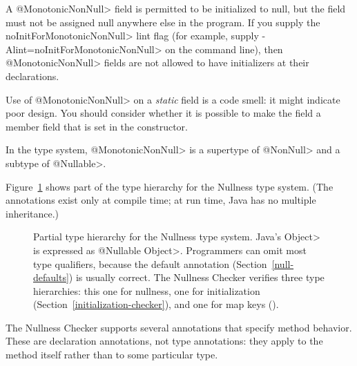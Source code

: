 \begin{description}
  A \<@MonotonicNonNull> field is permitted to be initialized to null, but the
  field must not be assigned null anywhere else in the program.  If you
  supply the \<noInitForMonotonicNonNull> lint flag (for example, supply
  \<-Alint=noInitForMonotonicNonNull> on the command line), then
  \<@MonotonicNonNull> fields are not allowed to have initializers at their
  declarations.

  Use of \<@MonotonicNonNull> on a \emph{static} field is a code smell:  it might
  indicate poor design.  You should consider whether it is possible to make
  the field a member field that is set in the constructor.

  In the type system, \<@MonotonicNonNull> is a supertype of \<@NonNull>
  and a subtype of \<@Nullable>.

\end{description}

Figure~\ref{fig-nullness-hierarchy} shows part of the type hierarchy for the
Nullness type system.
(The annotations exist only at compile time; at run time, Java has no
multiple inheritance.)

\begin{figure}
\iffalse %
\caption{Partial type hierarchy for the Nullness type system.
Java's \<Object> is expressed as \<@Nullable Object>.  Programmers can omit
most type qualifiers, because the default annotation
(Section~\ref{null-defaults}) is usually correct.
The Nullness Checker verifies four type hierarchies:  this one for
nullness, one for initialization (Section~\ref{initialization-checker}),
one for map keys (\chapterpageref{map-key-checker}),
and one for path shapes (\chapterpageref{path-shape-checker}).}
\else
\caption{Partial type hierarchy for the Nullness type system.
Java's \<Object> is expressed as \<@Nullable Object>.  Programmers can omit
most type qualifiers, because the default annotation
(Section~\ref{null-defaults}) is usually correct.
The Nullness Checker verifies three type hierarchies:  this one for
nullness, one for initialization (Section~\ref{initialization-checker}),
and one for map keys ().}
\fi
\label{fig-nullness-hierarchy}
\end{figure}



The Nullness Checker supports several annotations that specify method
behavior.  These are declaration annotations, not type annotations:  they
apply to the method itself rather than to some particular type.

